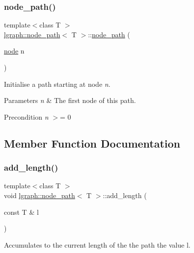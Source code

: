 \subsubsection{\texorpdfstring{node\+\_\+path()}{node\_path()}}
{\footnotesize\ttfamily template$<$class T $>$ \\
\hyperlink{classlgraph_1_1node__path}{lgraph\+::node\+\_\+path}$<$ T $>$\+::\hyperlink{classlgraph_1_1node__path}{node\+\_\+path} (\begin{DoxyParamCaption}\item[{\hyperlink{namespacelgraph_a397169dd66adf725210a30fb7251773e}{node}}]{n }\end{DoxyParamCaption})}



Initialise a path starting at node {\itshape n}. 


\begin{DoxyParams}{Parameters}
{\em n} & The first node of this path. \\
\hline
\end{DoxyParams}
\begin{DoxyPrecond}{Precondition}
{\itshape n} $>$= 0 
\end{DoxyPrecond}


\subsection{Member Function Documentation}
\mbox{\label{classlgraph_1_1node__path_a65d2c02853fde5e1c004b74d2caf86e0}} 
\subsubsection{\texorpdfstring{add\+\_\+length()}{add\_length()}}
{\footnotesize\ttfamily template$<$class T $>$ \\
void \hyperlink{classlgraph_1_1node__path}{lgraph\+::node\+\_\+path}$<$ T $>$\+::add\+\_\+length (\begin{DoxyParamCaption}\item[{const T \&}]{l }\end{DoxyParamCaption})}



Accumulates to the current length of the the path the value l. 


